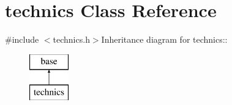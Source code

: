 \hypertarget{classtechnics}{
\section{technics Class Reference}
\label{classtechnics}
}


{\ttfamily \#include $<$technics.h$>$}Inheritance diagram for technics::\begin{figure}[H]
\begin{center}
\leavevmode
\includegraphics[height=2cm]{classtechnics}
\end{center}
\end{figure}
